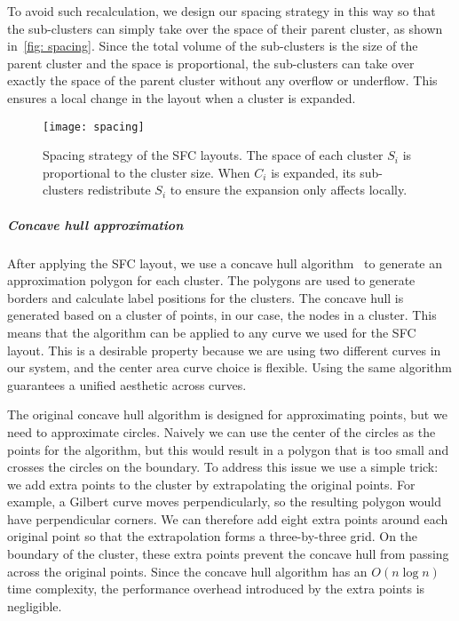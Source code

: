 To avoid such recalculation, we design our spacing strategy in this way so that the sub-clusters can simply take over the space of their parent cluster, as shown in~\autoref{fig: spacing}.
Since the total volume of the sub-clusters is the size of the parent cluster and the space is proportional, the sub-clusters can take over exactly the space of the parent cluster without any overflow or underflow.
This ensures a local change in the layout when a cluster is expanded.
\begin{figure}
 \centering %
 \texttt{[image: spacing]}
 \caption{Spacing strategy of the SFC layouts. The space of each cluster $S_i$ is proportional to the cluster size. When $C_i$ is expanded, its sub-clusters redistribute $S_i$ to ensure the expansion only affects locally. }
\label{fig: spacing}
\end{figure}
\vspace*{-0.3cm}
\subparagraph{Concave hull approximation}
After applying the SFC layout, we use a concave hull algorithm~\cite{park2012concavehull} to generate an approximation polygon for each cluster.
The polygons are used to generate borders and calculate label positions for the clusters.
The concave hull is generated based on a cluster of points, in our case, the nodes in a cluster.
This means that the algorithm can be applied to any curve we used for the SFC layout.
This is a desirable property because we are using two different curves in our system, and the center area curve choice is flexible.
Using the same algorithm guarantees a unified aesthetic across curves.

The original concave hull algorithm is designed for approximating points, but we need to approximate circles.
Naively we can use the center of the circles as the points for the algorithm, but this would result in a polygon that is too small and crosses the circles on the boundary.
To address this issue we use a simple trick: we add extra points to the cluster by extrapolating the original points.
For example, a Gilbert curve moves perpendicularly, so the resulting polygon would have perpendicular corners. 
We can therefore add eight extra points around each original point so that the extrapolation forms a three-by-three grid.
On the boundary of the cluster, these extra points prevent the concave hull from passing across the original points.
Since the concave hull algorithm has an $O(n\log n)$ time complexity, the performance overhead introduced by the extra points is negligible.

